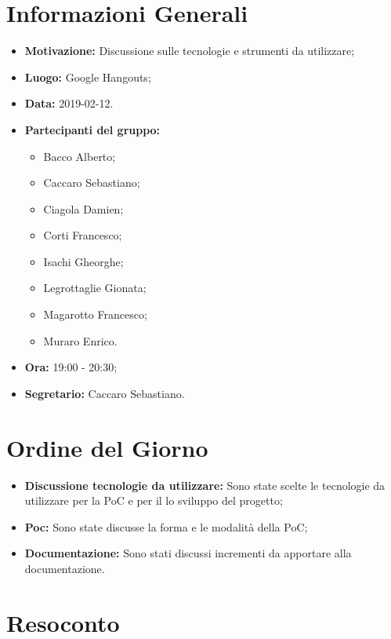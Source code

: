 \documentclass[a4paper, oneside, openany, dvipsnames, table]{article}
\begin{document}
\copertina{}


\newpage
\tableofcontents
\newpage
\section{Informazioni Generali}
\begin{itemize}
\item \textbf{Motivazione:} Discussione sulle tecnologie e strumenti da utilizzare;
\item \textbf{Luogo:} Google Hangouts;
\item \textbf{Data:} 2019-02-12.
\item \textbf{Partecipanti del gruppo:} \hfill
	\begin{itemize}
	\item Bacco Alberto;
	\item Caccaro Sebastiano;
	\item Ciagola Damien;
	\item Corti Francesco;
	\item Isachi Gheorghe;
	\item Legrottaglie Gionata;
	\item Magarotto Francesco;
	\item Muraro Enrico.
	\end{itemize} 
\item \textbf{Ora:} 19:00 - 20:30;
\item \textbf{Segretario:} Caccaro Sebastiano.
\end{itemize}

\section{Ordine del Giorno}
\begin{itemize}
	\item \textbf{Discussione tecnologie da utilizzare:} Sono state scelte le tecnologie da utilizzare per la PoC e per il lo sviluppo del progetto;
	\item \textbf{Poc:} Sono state discusse la forma e le modalità della PoC;
	\item \textbf{Documentazione:} Sono stati discussi incrementi da apportare alla documentazione.
\end{itemize}

\section{Resoconto}
\end{document}
